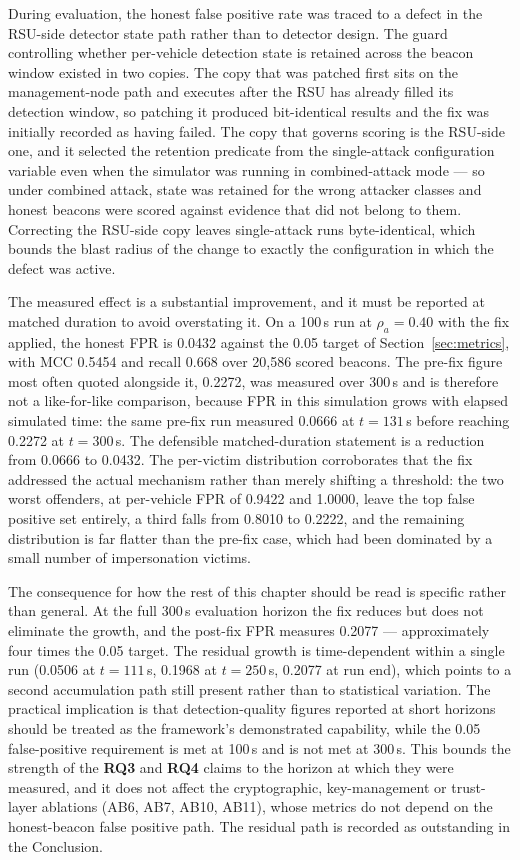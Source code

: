 \documentclass[12pt, a4paper]{report}
\begin{document}
During evaluation, the honest false positive rate was traced to a defect
in the RSU-side detector state path rather than to detector design. The
guard controlling whether per-vehicle detection state is retained across
the beacon window existed in two copies. The copy that was patched first
sits on the management-node path and executes after the RSU has already
filled its detection window, so patching it produced bit-identical
results and the fix was initially recorded as having failed. The copy
that governs scoring is the RSU-side one, and it selected the retention
predicate from the single-attack configuration variable even when the
simulator was running in combined-attack mode --- so under combined
attack, state was retained for the wrong attacker classes and honest
beacons were scored against evidence that did not belong to them.
Correcting the RSU-side copy leaves single-attack runs byte-identical,
which bounds the blast radius of the change to exactly the configuration
in which the defect was active.

The measured effect is a substantial improvement, and it must be
reported at matched duration to avoid overstating it. On a 100\,s run at
$\rho_a = 0.40$ with the fix applied, the honest FPR is 0.0432 against
the 0.05 target of Section~\ref{sec:metrics}, with MCC 0.5454 and recall
0.668 over 20{,}586 scored beacons. The pre-fix figure most often quoted
alongside it, 0.2272, was measured over 300\,s and is therefore not a
like-for-like comparison, because FPR in this simulation grows with
elapsed simulated time: the same pre-fix run measured 0.0666 at
$t = 131$\,s before reaching 0.2272 at $t = 300$\,s. The defensible
matched-duration statement is a reduction from 0.0666 to 0.0432. The
per-victim distribution corroborates that the fix addressed the actual
mechanism rather than merely shifting a threshold: the two worst
offenders, at per-vehicle FPR of 0.9422 and 1.0000, leave the top false
positive set entirely, a third falls from 0.8010 to 0.2222, and the
remaining distribution is far flatter than the pre-fix case, which had
been dominated by a small number of impersonation victims.

The consequence for how the rest of this chapter should be read is
specific rather than general. At the full 300\,s evaluation horizon the
fix reduces but does not eliminate the growth, and the post-fix FPR
measures 0.2077 --- approximately four times the 0.05 target. The
residual growth is time-dependent within a single run (0.0506 at
$t = 111$\,s, 0.1968 at $t = 250$\,s, 0.2077 at run end), which points to
a second accumulation path still present rather than to statistical
variation. The practical implication is that detection-quality figures
reported at short horizons should be treated as the framework's
demonstrated capability, while the 0.05 false-positive requirement is
met at 100\,s and is not met at 300\,s. This bounds the strength of the
\textbf{RQ3} and \textbf{RQ4} claims to the horizon at which they were
measured, and it does not affect the cryptographic, key-management or
trust-layer ablations (AB6, AB7, AB10, AB11), whose metrics do not
depend on the honest-beacon false positive path. The residual path is
recorded as outstanding in the Conclusion.
\end{document}
